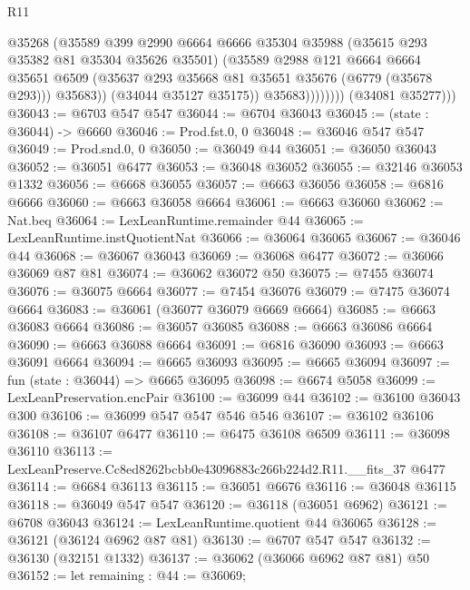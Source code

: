 \begin{lexlean}{R11}
\begin{coremodule}
                          @35268
                          (@35589
                            @399
                            @2990
                            @6664
                            @6666
                            @35304
                            @35988
                            (@35615 @293 @35382 @81 @35304 @35626 @35501)
                            (@35589
                              @2988
                              @121
                              @6664
                              @6664
                              @35651
                              @6509
                              (@35637 @293 @35668 @81 @35651 @35676 (@6779 (@35678 @293)))
                              @35683))
                          (@34044 @35127 @35175))
                        @35683))))))))
        (@34081 @35277)))
@36043 := @6703 @547 @547
@36044 := @6704 @36043
@36045 := (state : @36044) -> @6660
@36046 := Prod.fst.{0, 0}
@36048 := @36046 @547 @547
@36049 := Prod.snd.{0, 0}
@36050 := @36049 @44
@36051 := @36050 @36043
@36052 := @36051 @6477
@36053 := @36048 @36052
@36055 := @32146 @36053 @1332
@36056 := @6668 @36055
@36057 := @6663 @36056
@36058 := @6816 @6666
@36060 := @6663 @36058 @6664
@36061 := @6663 @36060
@36062 := Nat.beq
@36064 := LexLeanRuntime.remainder @44
@36065 := LexLeanRuntime.instQuotientNat
@36066 := @36064 @36065
@36067 := @36046 @44
@36068 := @36067 @36043
@36069 := @36068 @6477
@36072 := @36066 @36069 @87 @81
@36074 := @36062 @36072 @50
@36075 := @7455 @36074
@36076 := @36075 @6664
@36077 := @7454 @36076
@36079 := @7475 @36074 @6664
@36083 := @36061 (@36077 @36079 @6669 @6664)
@36085 := @6663 @36083 @6664
@36086 := @36057 @36085
@36088 := @6663 @36086 @6664
@36090 := @6663 @36088 @6664
@36091 := @6816 @36090
@36093 := @6663 @36091 @6664
@36094 := @6665 @36093
@36095 := @6665 @36094
@36097 := fun (state : @36044) => @6665 @36095
@36098 := @6674 @5058
@36099 := LexLeanPreservation.encPair
@36100 := @36099 @44
@36102 := @36100 @36043 @300
@36106 := @36099 @547 @547 @546 @546
@36107 := @36102 @36106
@36108 := @36107 @6477
@36110 := @6475 @36108 @6509
@36111 := @36098 @36110
@36113 := LexLeanPreserve.Cc8ed8262bcbb0e43096883c266b224d2.R11.__fits_37 @6477
@36114 := @6684 @36113
@36115 := @36051 @6676
@36116 := @36048 @36115
@36118 := @36049 @547 @547
@36120 := @36118 (@36051 @6962)
@36121 := @6708 @36043
@36124 := LexLeanRuntime.quotient @44 @36065
@36128 := @36121 (@36124 @6962 @87 @81)
@36130 := @6707 @547 @547
@36132 := @36130 (@32151 @1332)
@36137 := @36062 (@36066 @6962 @87 @81) @50
@36152 := let remaining : @44 := @36069;

\end{coremodule}
\end{lexlean}

